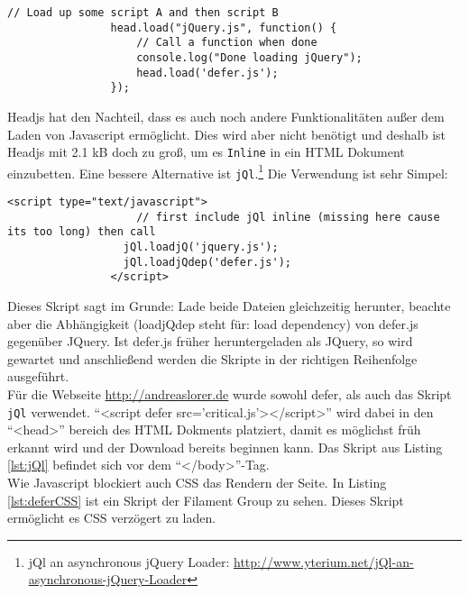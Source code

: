				\begin{lstlisting}[captionpos=b, caption=Headjs dependency loading (Listing nach http://headjs.com/), label=lst:headjs]
				// Load up some script A and then script B
				head.load("jQuery.js", function() {
				    // Call a function when done
				    console.log("Done loading jQuery");
				    head.load('defer.js');
				});
				\end{lstlisting}

				Headjs hat den Nachteil, dass es auch noch andere Funktionalitäten außer dem Laden von Javascript ermöglicht. Dies wird aber nicht benötigt und deshalb ist Headjs mit 2.1 kB doch zu groß, um es \texttt{Inline} in ein HTML Dokument einzubetten. Eine bessere Alternative ist \texttt{jQl}.\footnote{jQl an asynchronous jQuery Loader: \url{http://www.yterium.net/jQl-an-asynchronous-jQuery-Loader}}
				Die Verwendung ist sehr Simpel:

				\begin{lstlisting}[captionpos=b, caption=jQl asynchronous jQuery-Loader, label=lst:jQl]
				<script type="text/javascript">
					// first include jQl inline (missing here cause its too long) then call
				  jQl.loadjQ('jquery.js');
				  jQl.loadjQdep('defer.js');
				</script>
				\end{lstlisting}

				Dieses Skript sagt im Grunde: Lade beide Dateien gleichzeitig herunter, beachte aber die Abhängigkeit (loadjQdep steht für: load dependency) von defer.js gegenüber JQuery. Ist defer.js früher heruntergeladen als JQuery, so wird gewartet und anschließend werden die Skripte in der richtigen Reihenfolge ausgeführt.\\

				Für die Webseite \url{http://andreaslorer.de} wurde sowohl defer, als auch das Skript \texttt{jQl} verwendet. "`<script defer src='critical.js'></script>"' wird dabei in den "`<head>"' bereich des HTML Dokments platziert, damit es möglichst früh erkannt wird und der Download bereits beginnen kann. Das Skript aus Listing \ref{lst:jQl} befindet sich vor dem "`</body>"'-Tag.\\

				Wie Javascript blockiert auch CSS das Rendern der Seite. In Listing \ref{lst:deferCSS} ist ein Skript der Filament Group zu sehen. Dieses Skript ermöglicht es CSS verzögert zu laden. 

